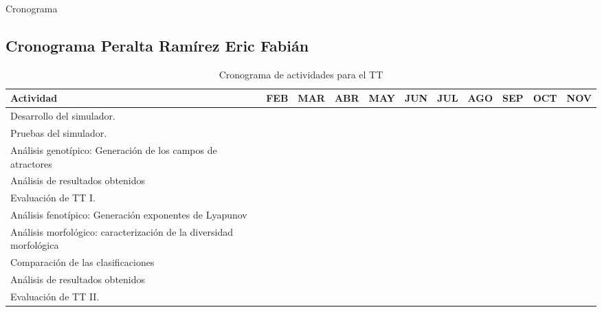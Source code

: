\documentclass{article}
\begin{document}
    \begin{section}{Cronograma}
        \subsection{Cronograma Peralta Ramírez Eric Fabián }
            \begin{table}[H]
                \centering
                \caption{Cronograma de actividades para el TT}
                \label{my-label}
                \begin{tabular}{|p{5cm}|l|l|l|l|l|l|l|l|l|l|}
                    \hline
                    Actividad & FEB & MAR & ABR & MAY & JUN & JUL & AGO & SEP & OCT & NOV \\ \hline
                    Desarrollo del simulador.  & \cellcolor[gray]{0.73}  & \cellcolor[gray]{0.73} &  &  &  &  &  &  &  &  \\ \hline
                    Pruebas del simulador.  &  & & \cellcolor[gray]{0.73}   &  &  &  &  &  &  &  \\ \hline
                    Análisis genotípico: Generación de los campos de atractores &  &  & \cellcolor[gray]{0.73} & \cellcolor[gray]{0.73}  &  &  &  &  &  &  \\ \hline
                    Análisis de resultados obtenidos &  &  &  & \cellcolor[gray]{0.73}  & \cellcolor[gray]{0.73}  &  &  &  &  &  \\ \hline
                    Evaluación de TT I.&  &  &  &  & \cellcolor[gray]{0.73}  &  &  &  &  &  \\ \hline
                    Análisis fenotípico: Generación exponentes de Lyapunov&  &  &  &  &  & \cellcolor[gray]{0.73}  &  &  &  &  \\ \hline
                    Análisis morfológico: caracterización de la diversidad morfológica&  &  &  &  &  &  & \cellcolor[gray]{0.73}  &  \cellcolor[gray]{0.73} &  &  \\ \hline
                    Comparación de las clasificaciones &  &  &  &  &  &  &  &  & \cellcolor[gray]{0.73}   &  \\ \hline
                    Análisis de resultados obtenidos&  &  &  &  &  &  &  &  & \cellcolor[gray]{0.73}  &  \\ \hline
                    Evaluación de TT II.&  &  &  &  &  &  &  &  &  & \cellcolor[gray]{0.73}\\ \hline
                \end{tabular}
            \end{table}
            

\end{section}
\end{document}
